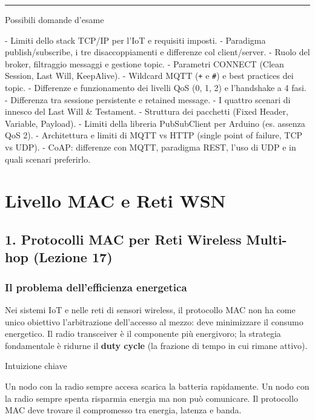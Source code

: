 \documentclass[
  italian,
  openany]{book}
\begin{document}
\begin{center}\rule{0.5\linewidth}{0.5pt}\end{center}

\begin{calloutquestion}{Possibili domande d’esame}

- Limiti dello stack TCP/IP per l'IoT e requisiti imposti. - Paradigma
publish/subscribe, i tre disaccoppiamenti e differenze col
client/server. - Ruolo del broker, filtraggio messaggi e gestione topic.
- Parametri CONNECT (Clean Session, Last Will, KeepAlive). - Wildcard
MQTT (\texttt{+} e \texttt{\#}) e best practices dei topic. - Differenze
e funzionamento dei livelli QoS (0, 1, 2) e l'handshake a 4 fasi. -
Differenza tra sessione persistente e retained message. - I quattro
scenari di innesco del Last Will \& Testament. - Struttura dei pacchetti
(Fixed Header, Variable, Payload). - Limiti della libreria PubSubClient
per Arduino (es. assenza QoS 2). - Architettura e limiti di MQTT vs HTTP
(single point of failure, TCP vs UDP). - CoAP: differenze con MQTT,
paradigma REST, l'uso di UDP e in quali scenari preferirlo.

\end{calloutquestion}

\newpage

\chapter{Livello MAC e Reti WSN}\label{livello-mac-e-reti-wsn}

\section{1. Protocolli MAC per Reti Wireless Multi-hop (Lezione
17)}\label{protocolli-mac-per-reti-wireless-multi-hop-lezione-17}

\subsection{Il problema dell'efficienza
energetica}\label{il-problema-dellefficienza-energetica}

Nei sistemi IoT e nelle reti di sensori wireless, il protocollo MAC non
ha come unico obiettivo l'arbitrazione dell'accesso al mezzo: deve
minimizzare il consumo energetico. Il radio transceiver è il componente
più energivoro; la strategia fondamentale è ridurne il \textbf{duty
cycle} (la frazione di tempo in cui rimane attivo).

\begin{callouttip}{Intuizione chiave}

Un nodo con la radio sempre accesa scarica la batteria rapidamente. Un
nodo con la radio sempre spenta risparmia energia ma non può comunicare.
Il protocollo MAC deve trovare il compromesso tra energia, latenza e
banda.

\end{callouttip}
\end{document}
